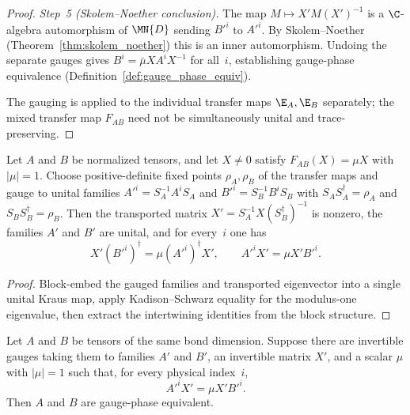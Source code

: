 \begin{proof}
    \emph{Step~5 (Skolem--Noether conclusion).}
    The map $M \mapsto X' M (X')^{-1}$ is a $\C$-algebra automorphism
    of $\MN{D}$ sending $B'^i$ to $A'^i$.
    By Skolem--Noether (Theorem~\ref{thm:skolem_noether}) this is an
    inner automorphism. Undoing the separate gauges gives
    $B^i = \bar{\mu} X A^i X^{-1}$ for all~$i$,
    establishing gauge-phase equivalence
    (Definition~\ref{def:gauge_phase_equiv}).

    The gauging is applied to the individual transfer maps
    $\E_A,\E_B$ separately; the mixed transfer map $F_{AB}$ need not be
    simultaneously unital and trace-preserving.
\end{proof}

\begin{lemma}%
    \label{thm:gauged_intertwining_core}
    \leanok
    Let $A$ and $B$ be normalized tensors, and let $X \neq 0$ satisfy
    $F_{AB}(X) = \mu X$ with $|\mu| = 1$.
    Choose positive-definite fixed points $\rho_A,\rho_B$ of the transfer maps
    and gauge to unital families
    $A'^i = S_A^{-1} A^i S_A$ and $B'^i = S_B^{-1} B^i S_B$ with
    $S_A S_A^\dagger = \rho_A$ and $S_B S_B^\dagger = \rho_B$.
    Then the transported matrix $X' = S_A^{-1} X (S_B^\dagger)^{-1}$ is nonzero,
    the families $A'$ and $B'$ are unital, and for every~$i$ one has
    \[
        X' (B'^i)^\dagger = \mu (A'^i)^\dagger X',
        \qquad
        A'^i X' = \mu X' B'^i.
    \]
\end{lemma}

\begin{proof}\leanok
    Block-embed the gauged families and transported eigenvector into a
    single unital Kraus map, apply Kadison--Schwarz equality for the
    modulus-one eigenvalue, then extract the intertwining identities
    from the block structure.
\end{proof}

\begin{lemma}%
    \label{thm:gauged_intertwining_gauge_phase}
    \leanok
    Let $A$ and $B$ be tensors of the same bond dimension.
    Suppose there are invertible gauges taking them to families $A'$ and $B'$,
    an invertible matrix $X'$, and a scalar $\mu$ with $|\mu| = 1$ such that,
    for every physical index~$i$,
    \[
        A'^i X' = \mu X' B'^i.
    \]
    Then $A$ and $B$ are gauge-phase equivalent.
\end{lemma}

